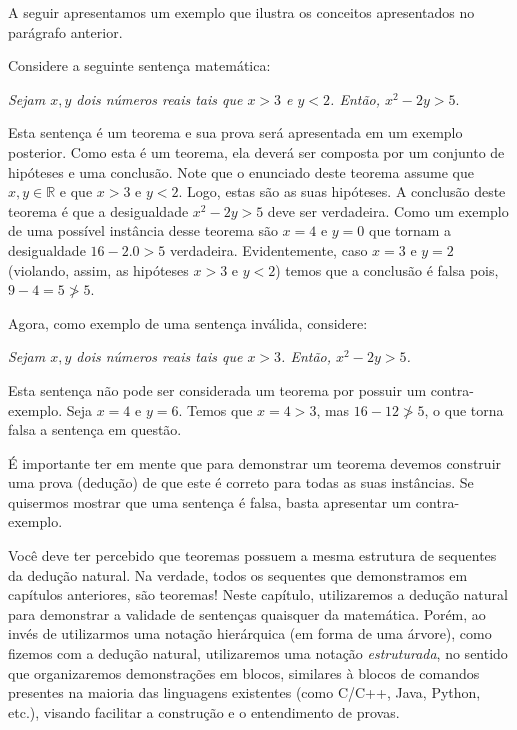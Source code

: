 A seguir apresentamos um exemplo que ilustra os conceitos apresentados
no parágrafo anterior.

\begin{Example}
Considere a seguinte sentença matemática:
\begin{center}
\textit{Sejam $x,y$ dois números reais tais que $x > 3$ e $y < 2$. Então, $x^2
- 2y > 5$}.
\end{center}
Esta sentença é um teorema e sua prova será apresentada em um exemplo
posterior. Como esta é um teorema, ela deverá ser composta por um
conjunto de hipóteses e uma conclusão. Note que o enunciado deste
teorema assume que $x,y\in\mathbb{R}$ e que $x > 3$ e $y < 2$. Logo,
estas são as suas hipóteses. A conclusão deste teorema é que
a desigualdade $x^2 - 2y > 5$ deve ser verdadeira. Como um exemplo de
uma possível instância desse teorema são $x = 4$ e $y = 0$ que tornam a
desigualdade $16 - 2.0 > 5$ verdadeira. Evidentemente, caso $x = 3$ e
$y = 2$ (violando, assim, as hipóteses $x > 3$ e $y < 2$) temos que a
conclusão é falsa pois, $9 - 4 = 5 \not> 5$.

Agora, como exemplo de uma sentença inválida, considere:
\begin{center}
\textit{Sejam $x,y$ dois números reais tais que $x > 3$. Então, $x^2
- 2y > 5$.}
\end{center}
Esta sentença não pode ser considerada um teorema por possuir um
contra-exemplo. Seja $x= 4$ e $y = 6$. Temos que $x = 4 > 3$, mas
$16 - 12 \not > 5$, o que torna falsa a sentença em questão.

É importante ter em mente que para demonstrar um teorema devemos
construir uma prova (dedução) de que este é correto para todas as suas
instâncias. Se quisermos mostrar que uma sentença é falsa, basta
apresentar um contra-exemplo.
\end{Example}

Você deve ter percebido que
teoremas possuem a mesma estrutura de sequentes da dedução
natural. Na verdade, todos os sequentes que demonstramos em capítulos
anteriores, são teoremas! Neste capítulo, utilizaremos a dedução
natural para demonstrar a validade de sentenças quaisquer da
matemática. Porém, ao invés de utilizarmos uma notação hierárquica (em
forma de uma árvore), como fizemos com a dedução natural, utilizaremos
uma notação \textit{estruturada}, no sentido que organizaremos
demonstrações em blocos, similares à blocos de comandos presentes na
maioria das linguagens existentes (como C/C++, Java, Python,
etc.), visando facilitar a construção e o entendimento de provas.

